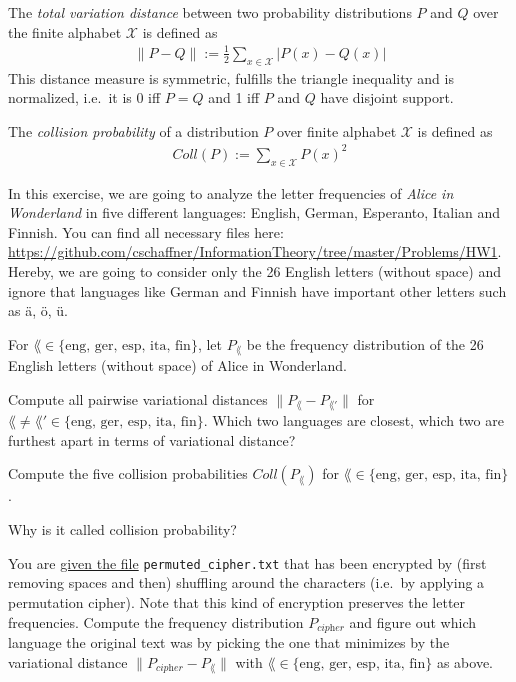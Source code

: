 \documentclass[a4paper,10pt,landscape,twocolumn]{scrartcl}
\begin{document}
\begin{exercise}
The \emph{total variation distance} between two probability distributions $P$ and $Q$
over the finite alphabet $\mathcal{X}$ is defined as 
\begin{align*}
\| P - Q \| := \frac12 \sum_{x \in \mathcal{X} } | P(x) - Q(x) | 
\end{align*}
This distance measure is symmetric, fulfills the triangle inequality and is normalized, i.e.\ it is 0 iff $P=Q$ and 1 iff $P$ and $Q$ have disjoint support.

The \emph{collision probability} of a distribution $P$ over finite alphabet $\mathcal{X}$ is defined as
\begin{align*}
Coll(P) := \sum_{x \in \mathcal{X}} P(x)^2
\end{align*}

In this exercise, we are going to analyze the letter frequencies of \emph{Alice in
  Wonderland} in five different languages: English, German, Esperanto,
Italian and Finnish. You can find all necessary files here: \url{https://github.com/cschaffner/InformationTheory/tree/master/Problems/HW1}. Hereby, we are going to consider only the 26 English letters (without space) and ignore that languages like German and Finnish have important other letters such as {\"a}, {\"o}, {\"u}. 

For $\lang \in \{ \textrm{eng, ger, esp, ita, fin} \}$, let $P_{\lang}$ be the frequency distribution of the 26 English letters (without space) of Alice in Wonderland.

\begin{subex}[(2pt)]
Compute all pairwise variational distances $\| P_{\lang} - P_{\lang'} \|$ for $\lang \neq \lang' \in \{ \textrm{eng, ger, esp, ita, fin} \}$. Which two languages are closest, which two are furthest apart in terms of variational distance?
\end{subex}

\begin{subex}[(2pt)]
Compute the five collision probabilities $Coll(P_{\lang})$ for  $\lang \in \{ \textrm{eng, ger, esp, ita, fin} \}$. 
\end{subex}

\begin{subex}[(1pt)]
 Why is it called collision probability?
\end{subex}

\begin{subex}[(2pt)]
  You are \href{https://github.com/cschaffner/InformationTheory/blob/master/Problems/HW1/permuted_cipher.txt}{given the file} {\tt permuted\_cipher.txt} that has been encrypted by (first removing spaces and then) shuffling around the
characters (i.e.\ by applying a permutation cipher). Note that this kind of 
encryption preserves the letter frequencies. Compute the frequency distribution
$P_{\textit{cipher}}$ and figure out which language the original text was by
picking the one that minimizes by the variational distance
$\| P_{\textit{cipher}} - P_{\lang}\|$ with $\lang \in \{
\textrm{eng, ger, esp, ita, fin} \}$ as above.
\end{subex}


\end{exercise}
\end{document}
